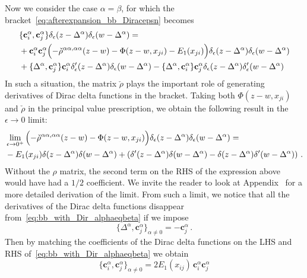 Now we consider the case $\alpha=\beta$, for which the bracket~\eqref{eq:afterexpansion_bb_Diracepsn} becomes
\begin{equation}
\label{eq:bb_with_Dir_alphaeqbeta}
\begin{split}
&\{\mathbf{c}_i^\alpha,\mathbf{c}_j^\alpha\} \delta_\epsilon(z-\Delta^\alpha) \delta_\epsilon(w-\Delta^\alpha)= \\
&+\mathbf{c}_i^\alpha \mathbf{c}_j^\alpha\Bigl(-\check{\rho}^{\alpha \alpha, \alpha \alpha}(z-w)-    \Phi(z-w, x_{ji})    -  E_1(x_{ji})     \Bigr) \delta_\epsilon(z-\Delta^\alpha) \delta_\epsilon(w-\Delta^\alpha) \\
&+\{\Delta^\alpha ,\mathbf{c}_j^\alpha\} \mathbf{c}_i^\alpha \delta'_\epsilon(z-\Delta^\alpha) \delta_\epsilon(w-\Delta^\alpha)-\{\Delta^\alpha ,\mathbf{c}_i^\alpha\} \mathbf{c}_j^\alpha \delta_\epsilon(z-\Delta^\alpha) \delta'_\epsilon(w-\Delta^\alpha)
\end{split}
\end{equation}
In such a situation, the matrix $\check{\rho}$ plays the important role of generating derivatives of Dirac delta functions
in the bracket. Taking both $\Phi(z-w, x_{ji})$ and  $\check{\rho}$ in the principal value prescription, we obtain the following result in the $\epsilon \to 0$ limit:
\begin{equation}
\begin{split}
&\lim_{\epsilon \to 0^+} \, \Bigl(-\check{\rho}^{\alpha \alpha, \alpha \alpha}(z-w)-    \Phi(z-w, x_{ji})     \Bigr) \delta_\epsilon(z-\Delta^\alpha) \delta_\epsilon(w-\Delta^\alpha) = \\
&-  
  E_1(x_{ji})    \delta(z-\Delta^\alpha)\delta(w-\Delta^\alpha)+ \left(\delta'(z-\Delta^\alpha) \delta(w-\Delta^\alpha) - \delta(z-\Delta^\alpha) \delta'(w-\Delta^\alpha) \right) \,.
\end{split}
\end{equation}
Without the $\rho$ matrix, the second term on the RHS of the expression above would have had a $1/2$ coefficient.
We invite the reader to look at Appendix~ for a more detailed derivation of the limit.
From such a limit, we notice that all the derivatives of the Dirac delta functions disappear from~\eqref{eq:bb_with_Dir_alphaeqbeta} if we impose
\begin{equation}
\{\Delta^\alpha, \mathbf{c}_j^\alpha \}_{\alpha \ne 0} = -\mathbf{c}_j^\alpha \,.
\end{equation}
Then by matching the coefficients of the Dirac delta functions on the LHS and RHS of~\eqref{eq:bb_with_Dir_alphaeqbeta} we obtain
\begin{equation}
\label{eq:bb_with_Dir_alphaeqbeta2}
\{\mathbf{c}_i^\alpha,\mathbf{c}_j^\alpha\}_{\alpha \ne 0} = 
2 E_1(x_{ij})\, \mathbf{c}_i^\alpha \mathbf{c}_j^\alpha      
\end{equation}

